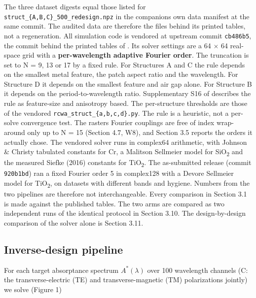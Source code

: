 \documentclass[11pt,a4paper]{article}
\begin{document}
The three dataset digests equal those listed for \texttt{struct\_\allowbreak{}\{A,\allowbreak{}B,\allowbreak{}C\}\_\allowbreak{}500\_\allowbreak{}redesign.\allowbreak{}npz} in
the companion\textquotesingle s own data manifest at the same commit. The audited data are therefore
the files behind its printed tables, not a regeneration. All simulation code is
vendored at upstream commit \texttt{cb486b5}, the commit behind the printed tables of \cite{choi20261}.
Its solver settings are a 64 \ensuremath{\times} 64 real-space grid with a \textbf{per-wavelength adaptive
Fourier order}. The truncation is set to N = 9, 13 or 17 by a fixed rule. For
Structures A and C the rule depends on the smallest metal feature, the patch aspect
ratio and the wavelength. For Structure D it depends on the smallest feature and air
gap alone. For Structure B it depends on the period-to-wavelength ratio.
Supplementary S16 of \cite{choi20261} describes the rule as feature-size and anisotropy based. The
per-structure thresholds are those of the vendored \texttt{rcwa\_\allowbreak{}struct\_\allowbreak{}\{a,\allowbreak{}b,\allowbreak{}c,\allowbreak{}d\}.\allowbreak{}py}. The
rule is a heuristic, not a per-solve convergence test. The raster\textquotesingle s Fourier couplings
are free of index wrap-around only up to N = 15 (Section 4.7, W8), and Section 3.5
reports the orders it actually chose. The vendored solver runs in complex64
arithmetic, with Johnson \& Christy tabulated constants for Cr, a Malitson Sellmeier
model for SiO\textsubscript{2} and the measured Siefke (2016) constants for TiO\textsubscript{2}. The as-submitted
release (commit \texttt{920b1bd}) ran a fixed Fourier order 5 in complex128 with a Devore
Sellmeier model for TiO\textsubscript{2}, on datasets with different bands and hygiene. Numbers from
the two pipelines are therefore not interchangeable. Every comparison in Section 3.1
is made against the published tables. The two arms are compared as two independent
runs of the identical protocol in Section 3.10. The design-by-design comparison of
the solver alone is Section 3.11.

\subsection{Inverse-design pipeline}\label{sec:2.2}

For each target absorptance spectrum \(A^{*}(\lambda)\) over 100 wavelength
channels (C: the transverse-electric (TE) and transverse-magnetic (TM) polarizations jointly) we solve (Figure 1)
\end{document}
